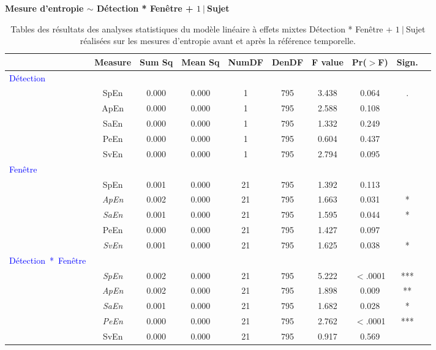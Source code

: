 \begin{table}[!t]
\centering
\scriptsize
\caption[Table des résultats des analyses statistiques pour les mesures d'entropie fenêtrées du cluster FC]{Tables des résultats des analyses statistiques du modèle linéaire à effets mixtes Détection * Fenêtre + $1~|~$Sujet réalisées sur les mesures d'entropie avant et après la référence temporelle.}
\label{tab:table5statsmesuresentropiefenetre}

\textbf{Mesure d'entropie $\sim$ Détection * Fenêtre + $1~|~$Sujet}

\begin{tabular}{|l|*{9}{c|}}
\hline
& \textbf{Measure} & \textbf{Sum Sq} & \textbf{Mean Sq} & \textbf{NumDF} & \textbf{DenDF} & \textbf{F value} & \textbf{Pr($>$F)} & \textbf{Sign.} \\ 
\hline
\textcolor{blue}{Détection} & & & & & & & & \\ 
\hline
& SpEn & 0.000 & 0.000 & 1 & 795 & 3.438 & 0.064 & .\\ 
& ApEn & 0.000 & 0.000 & 1 & 795 & 2.588 & 0.108 & \\ 
& SaEn & 0.000 & 0.000 & 1 & 795 & 1.332 & 0.249 & \\ 
& PeEn & 0.000 & 0.000 & 1 & 795 & 0.604 & 0.437 & \\ 
& SvEn & 0.000 & 0.000 & 1 & 795 & 2.794 & 0.095 & \\ 
\hline
\textcolor{blue}{Fenêtre} & & & & & & & & \\ 
\hline
& SpEn & 0.001 & 0.000 & 21 & 795 & 1.392 & 0.113 & \\ 
& \textit{ApEn} & 0.002 & 0.000 & 21 & 795 & 1.663 & 0.031 & * \\
& \textit{SaEn} & 0.001 & 0.000 & 21 & 795 & 1.595 & 0.044 & * \\ 
& PeEn & 0.000 & 0.000 & 21 & 795 & 1.427 & 0.097 & \\ 
& \textit{SvEn} & 0.001 & 0.000 & 21 & 795 & 1.625 & 0.038 & * \\ 
\hline
\textcolor{blue}{Détection~*~Fenêtre} & & & & & & & & \\ 
\hline
& \textit{SpEn} & 0.002 & 0.000 & 21 & 795 & 5.222 & $<$.0001 & ***\\ 
& \textit{ApEn} & 0.002 & 0.000 & 21 & 795 & 1.898 & 0.009 & ** \\ 
& \textit{SaEn} & 0.001 & 0.000 & 21 & 795 & 1.682 & 0.028 & * \\ 
& \textit{PeEn} & 0.000 & 0.000 & 21 & 795 & 2.762 & $<$.0001 & *** \\ 
& SvEn & 0.000 & 0.000 & 21 & 795 & 0.917 & 0.569 & \\ 
\hline
\end{tabular}

\end{table}

